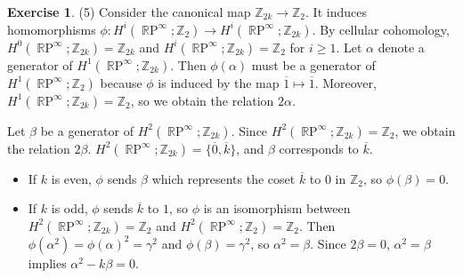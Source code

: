 \documentclass[12pt, psamsfonts]{amsart}
\theoremstyle{definition}
\newtheorem*{exer}{Exercise}
\theoremstyle{remark}
\DeclareMathOperator{\RP}{\mathbb{R}P}
\numberwithin{equation}{section}
\begin{document}
\begin{exer}{(5)}
  Consider the canonical map $\mathbb{Z}_{2k} \rightarrow \mathbb{Z}_2$.
  It induces homomorphisms $\phi: H^i(\RP^{\infty};\mathbb{Z}_{2}) \rightarrow H^i(\RP^{\infty};\mathbb{Z}_{2k})$.
  By cellular cohomology, $H^0(\RP^{\infty}; \mathbb{Z}_{2k}) = \mathbb{Z}_{2k}$ and $H^i(\RP^{\infty}; \mathbb{Z}_{2k}) = \mathbb{Z}_2$ for $i \geq 1$.
  Let $\alpha$ denote a generator of $H^1(\RP^{\infty};\mathbb{Z}_{2k})$.
  Then $\phi(\alpha)$ must be a generator of $H^1(\RP^{\infty};\mathbb{Z}_{2})$ because $\phi$ is induced by the map $\overline{1} \mapsto \overline{1}$.
  Moreover, $H^1(\RP^{\infty}; \mathbb{Z}_{2k}) = \mathbb{Z}_2$, so we obtain the relation $2\alpha$.

  Let $\beta$ be a generator of $H^2(\RP^{\infty};\mathbb{Z}_{2k})$.
  Since $H^2(\RP^{\infty};\mathbb{Z}_{2k}) = \mathbb{Z}_2$, we obtain the relation $2\beta$.
  $H^2(\RP^{\infty}; \mathbb{Z}_{2k}) = \{ \overline{0}, \overline{k} \}$, and $\beta$ corresponds to $\overline{k}$.

  \begin{itemize}
    \item
      If $k$ is even, $\phi$ sends $\beta$ which represents the coset $\overline{k}$ to 0 in $\mathbb{Z}_2$, so $\phi(\beta) = 0$.
    \item
      If $k$ is odd, $\phi$ sends $\overline{k}$ to $1$, so $\phi$ is an isomorphism between $H^2(\RP^{\infty}; \mathbb{Z}_{2k}) = \mathbb{Z}_2$ and $H^2(\RP^{\infty}; \mathbb{Z}_2) = \mathbb{Z}_2$.
      Then $\phi(\alpha^2) = \phi(\alpha)^2 = \gamma^2$ and $\phi(\beta) = \gamma^2$, so $\alpha^2 = \beta$.
      Since $2\beta = 0$, $\alpha^2 = \beta$ implies $\alpha^2 - k\beta = 0$.
  \end{itemize}
\end{exer}
\end{document}
